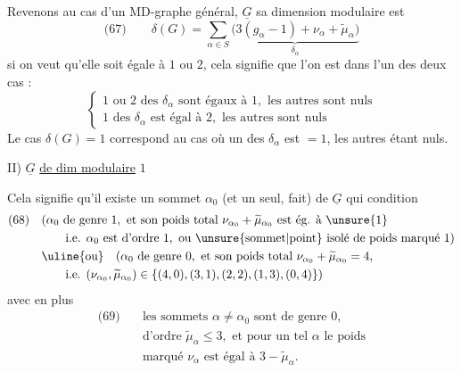 Revenons au cas d'un MD-graphe général, $\underline G$ sa dimension modulaire est
\[
\text{(67)}\qquad\delta(G)=\sum_{\alpha\in S}\underbrace{\bigl(3(g_\alpha-1)+\nu_\alpha+\widetilde\mu_\alpha\bigr)}_{\delta_\alpha}
\]
si on veut qu'elle soit égale à $1$ ou $2$, cela signifie que l'on est dans l'un des deux cas :
\[
\left\{\begin{array}{l}
1\text{ ou }2\text{ des }\delta_\alpha\text{ sont égaux à }1,\text{ les autres sont nuls}\\
1\text{ des }\delta_\alpha\text{ est égal à }2,\text{ les autres sont nuls}
\end{array}\right.
\]
Le cas $\delta(G)=1$ correspond au cas où  un des $\delta_\alpha$ est $=1$, les autres étant nuls.

II) $\underline G$ \uline{de dim modulaire} $1$

Cela signifie qu'il existe un sommet $\alpha_0$ (et un seul,  fait) de $\underline G$ qui   condition
\[
\begin{aligned}
\text{(68)}\quad &(\alpha_0\text{ de genre }1,\text{ et son poids total }\nu_{\alpha_0}+\widetilde\mu_{\alpha_0}\text{ est ég. à }\unsure{1}\\
&\qquad\text{i.e. }\alpha_0\text{ est d'ordre }1,\text{ ou \unsure{sommet|point} isolé de poids marqué }1)\\
&\uline{\text{ou}}\quad(\alpha_0\text{ de genre }0,\text{ et son poids total }\nu_{\alpha_0}+\widetilde\mu_{\alpha_0}=4,\\
&\qquad\text{i.e. }(\nu_{\alpha_0},\widetilde\mu_{\alpha_0})\in\{(4,0),(3,1),(2,2),(1,3),(0,4)\})
\end{aligned}
\]
avec en plus
\[
\begin{aligned}
\text{(69)}\quad&\text{les sommets }\alpha\ne\alpha_0\text{ sont de genre }0,\\
&\text{d'ordre }\widetilde\mu_\alpha\leq3,\text{ et pour un tel }\alpha\text{ le poids}\\
&\text{marqué }\nu_\alpha\text{ est égal à }3-\widetilde\mu_\alpha.
\end{aligned}
\]
